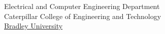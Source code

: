 \documentclass{article}
\def\dept{Electrical and Computer Engineering Department}
\def\college{Caterpillar College of Engineering and Technology}
\def\uname{Bradley University}
\begin{document}
\begin{center}
\vspace*{2.0cm}
\dept\\
\college\\
\href{http://www.bradley.edu/}{\uname}
\end{center}
\thispagestyle{empty}
\newpage


%
\pagestyle{fancy}
 \renewcommand{\contentsname}{Table of Contents}
 \tableofcontents %
 

 
 



\end{document}
